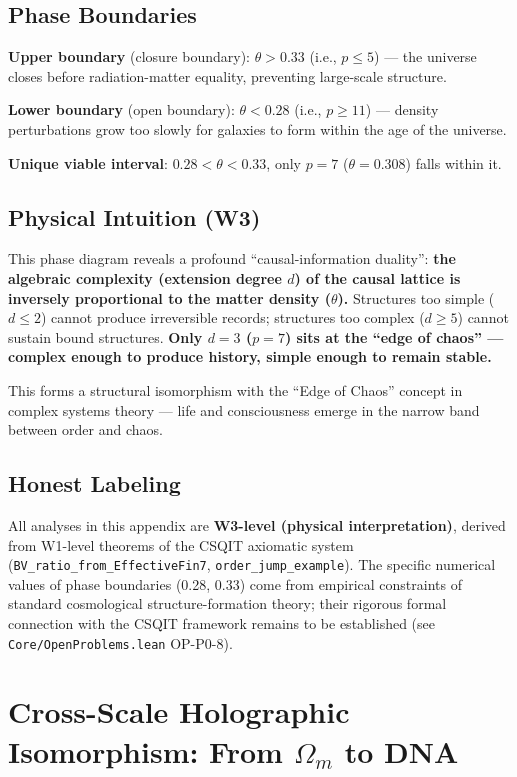 \documentclass[aps,prd,twocolumn,nofootinbib,floatfix]{revtex4-2}
\begin{document}
\subsection{Phase Boundaries}

\textbf{Upper boundary} (closure boundary): $\theta > 0.33$ (i.e., $p \le 5$) --- the universe closes before radiation-matter equality, preventing large-scale structure.

\textbf{Lower boundary} (open boundary): $\theta < 0.28$ (i.e., $p \ge 11$) --- density perturbations grow too slowly for galaxies to form within the age of the universe.

\textbf{Unique viable interval}: $0.28 < \theta < 0.33$, only $p=7$ ($\theta=0.308$) falls within it.

\subsection{Physical Intuition (W3)}

This phase diagram reveals a profound ``causal-information duality'': \textbf{the algebraic complexity (extension degree $d$) of the causal lattice is inversely proportional to the matter density ($\theta$).} Structures too simple ($d\leq 2$) cannot produce irreversible records; structures too complex ($d\geq 5$) cannot sustain bound structures. \textbf{Only $d=3$ ($p=7$) sits at the ``edge of chaos'' --- complex enough to produce history, simple enough to remain stable.}

This forms a structural isomorphism with the ``Edge of Chaos'' concept in complex systems theory --- life and consciousness emerge in the narrow band between order and chaos.

\subsection{Honest Labeling}

All analyses in this appendix are \textbf{W3-level (physical interpretation)}, derived from W1-level theorems of the CSQIT axiomatic system (\texttt{BV\_ratio\_from\_EffectiveFin7}, \texttt{order\_jump\_example}). The specific numerical values of phase boundaries (0.28, 0.33) come from empirical constraints of standard cosmological structure-formation theory; their rigorous formal connection with the CSQIT framework remains to be established (see \texttt{Core/OpenProblems.lean} OP-P0-8).

\section{Cross-Scale Holographic Isomorphism: From $\Omega_m$ to DNA}
\end{document}
